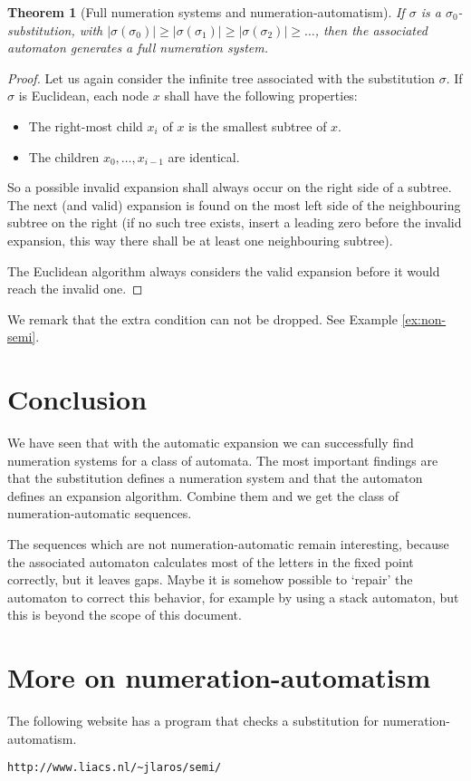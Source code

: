 \documentclass{article}
\newtheorem{theorem}{Theorem}[subsection]
\theoremstyle{definition}
\begin{document}
\begin{theorem}[Full numeration systems and numeration-automatism] 
\label{thm:fsa}
If $\sigma$ is a $\sigma_0$-substitution, with 
$|\sigma(\sigma_0)| \ge |\sigma(\sigma_1)| \ge |\sigma(\sigma_2)| \ge \ldots$, 
then the associated automaton generates a full numeration system.
\end{theorem}
\begin{proof}
Let us again consider the infinite tree associated with the substitution
$\sigma$. If $\sigma$ is Euclidean, each node $x$ shall have the following 
properties:
\begin{itemize}
\item The right-most child $x_i$ of $x$ is the smallest subtree of $x$.
\item The children $x_0, \ldots, x_{i - 1}$ are identical.
\end{itemize}
So a possible invalid expansion shall always occur on the right side of 
a subtree. The next (and valid) expansion is found on the most left side of 
the neighbouring subtree on the right (if no such tree exists, insert a 
leading zero before the invalid expansion, this way there shall be at least 
one neighbouring subtree).

The Euclidean algorithm always considers the valid expansion before it would
reach the invalid one.
\end{proof}

We remark that the extra condition can not be dropped. See Example 
\ref{ex:non-semi}.

\section{Conclusion}
We have seen that with the automatic expansion we can successfully find 
numeration systems for a class of automata. The most important findings are
that the substitution defines a numeration system and that the automaton 
defines an expansion algorithm. Combine them and we get the class of 
numeration-automatic sequences.

The sequences which are not numeration-automatic remain interesting, because 
the associated automaton calculates most of the letters in the fixed point 
correctly, but it leaves gaps.  Maybe it is somehow possible to `repair' the 
automaton to correct this behavior, for example by using a stack automaton, 
but this is beyond the scope of this document.

\section{More on numeration-automatism}
The following website has a program that checks a substitution for 
numeration-automatism.
\begin{verbatim}
http://www.liacs.nl/~jlaros/semi/
\end{verbatim}
\end{document}
